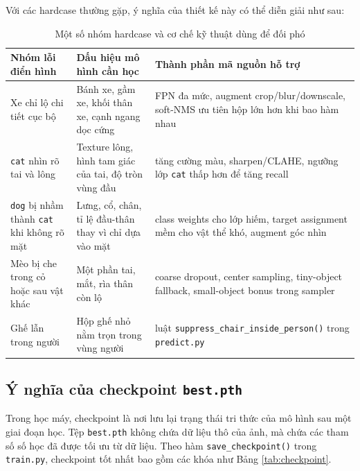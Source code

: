 \documentclass[12pt,a4paper]{article}
\begin{document}
Với các hardcase thường gặp, ý nghĩa của thiết kế này có thể diễn giải như sau:
\begin{table}[H]
\centering
\caption{Một số nhóm hardcase và cơ chế kỹ thuật dùng để đối phó}
\label{tab:hardcases}
\begin{tabularx}{\textwidth}{>{\raggedright\arraybackslash}p{3.0cm}Y Y}
\toprule
Nhóm lỗi điển hình & Dấu hiệu mô hình cần học & Thành phần mã nguồn hỗ trợ \\
\midrule
Xe chỉ lộ chi tiết cục bộ & Bánh xe, gầm xe, khối thân xe, cạnh ngang dọc cứng & FPN đa mức, augment crop/blur/downscale, soft-NMS ưu tiên hộp lớn hơn khi bao hàm nhau \\
\texttt{cat} nhìn rõ tai và lông & Texture lông, hình tam giác của tai, độ tròn vùng đầu & tăng cường màu, sharpen/CLAHE, ngưỡng lớp \texttt{cat} thấp hơn để tăng recall \\
\texttt{dog} bị nhầm thành \texttt{cat} khi không rõ mặt & Lưng, cổ, chân, tỉ lệ đầu-thân thay vì chỉ dựa vào mặt & class weights cho lớp hiếm, target assignment mềm cho vật thể khó, augment góc nhìn \\
Mèo bị che trong cỏ hoặc sau vật khác & Một phần tai, mắt, rìa thân còn lộ & coarse dropout, center sampling, tiny-object fallback, small-object bonus trong sampler \\
Ghế lẫn trong người & Hộp ghế nhỏ nằm trọn trong vùng người & luật \texttt{suppress\_chair\_inside\_person()} trong \texttt{predict.py} \\
\bottomrule
\end{tabularx}
\end{table}

\subsection{Ý nghĩa của checkpoint \texttt{best.pth}}
Trong học máy, checkpoint là nơi lưu lại trạng thái tri thức của mô hình sau một giai đoạn học. Tệp \texttt{best.pth} không chứa dữ liệu thô của ảnh, mà chứa các tham số số học đã được tối ưu từ dữ liệu. Theo hàm \texttt{save\_checkpoint()} trong \texttt{train.py}, checkpoint tốt nhất bao gồm các khóa như Bảng \ref{tab:checkpoint}.
\end{document}
